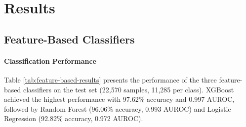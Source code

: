 \documentclass[11pt]{article}
\begin{document}
\section{Results}
\label{sec:results}

\subsection{Feature-Based Classifiers}

\paragraph{Classification Performance}
Table \ref{tab:feature-based-results} presents the performance of the three feature-based classifiers on the test set (22,570 samples, 11,285 per class). XGBoost achieved the highest performance with 97.62\% accuracy and 0.997 AUROC, followed by Random Forest (96.06\% accuracy, 0.993 AUROC) and Logistic Regression (92.82\% accuracy, 0.972 AUROC). 
\begin{table}[t]
\centering
\footnotesize
{}
\caption{Performance metrics for feature-based classifiers. Best values in bold.}
\label{tab:feature-based-results}
\end{table}
\end{document}
